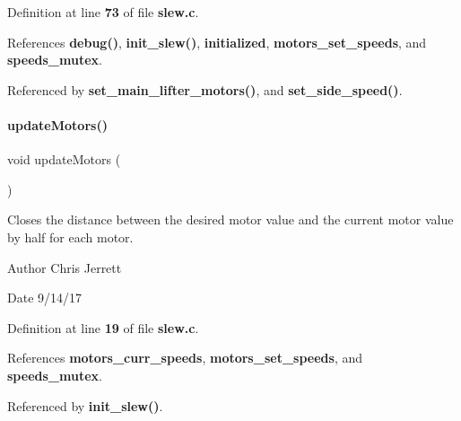 Definition at line \textbf{ 73} of file \textbf{ slew.\+c}.



References \textbf{ debug()}, \textbf{ init\+\_\+slew()}, \textbf{ initialized}, \textbf{ motors\+\_\+set\+\_\+speeds}, and \textbf{ speeds\+\_\+mutex}.



Referenced by \textbf{ set\+\_\+main\+\_\+lifter\+\_\+motors()}, and \textbf{ set\+\_\+side\+\_\+speed()}.

\mbox{\label{slew_8h_a807a87c5df438fde21c1e8213906695b}} 
\paragraph{update\+Motors()}
{\footnotesize\ttfamily void update\+Motors (\begin{DoxyParamCaption}{ }\end{DoxyParamCaption})}



Closes the distance between the desired motor value and the current motor value by half for each motor. 

\begin{DoxyAuthor}{Author}
Chris Jerrett 
\end{DoxyAuthor}
\begin{DoxyDate}{Date}
9/14/17 
\end{DoxyDate}


Definition at line \textbf{ 19} of file \textbf{ slew.\+c}.



References \textbf{ motors\+\_\+curr\+\_\+speeds}, \textbf{ motors\+\_\+set\+\_\+speeds}, and \textbf{ speeds\+\_\+mutex}.



Referenced by \textbf{ init\+\_\+slew()}.

